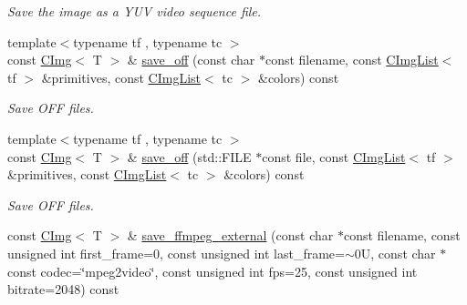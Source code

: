 \begin{DoxyCompactItemize}
\begin{DoxyCompactList}\small\item\em Save the image as a YUV video sequence file. \item\end{DoxyCompactList}\item 
\hypertarget{structcimg__library_1_1CImg_aa8165baedf5bff63743f29619bd17a2f}{
{\footnotesize template$<$typename tf , typename tc $>$ }\\const \hyperlink{structcimg__library_1_1CImg}{CImg}$<$ T $>$ \& \hyperlink{structcimg__library_1_1CImg_aa8165baedf5bff63743f29619bd17a2f}{save\_\-off} (const char $\ast$const filename, const \hyperlink{structcimg__library_1_1CImgList}{CImgList}$<$ tf $>$ \&primitives, const \hyperlink{structcimg__library_1_1CImgList}{CImgList}$<$ tc $>$ \&colors) const }
\label{structcimg__library_1_1CImg_aa8165baedf5bff63743f29619bd17a2f}

\begin{DoxyCompactList}\small\item\em Save OFF files. \item\end{DoxyCompactList}\item 
\hypertarget{structcimg__library_1_1CImg_a2b879f8faaf4b852516d990327dc75f1}{
{\footnotesize template$<$typename tf , typename tc $>$ }\\const \hyperlink{structcimg__library_1_1CImg}{CImg}$<$ T $>$ \& \hyperlink{structcimg__library_1_1CImg_a2b879f8faaf4b852516d990327dc75f1}{save\_\-off} (std::FILE $\ast$const file, const \hyperlink{structcimg__library_1_1CImgList}{CImgList}$<$ tf $>$ \&primitives, const \hyperlink{structcimg__library_1_1CImgList}{CImgList}$<$ tc $>$ \&colors) const }
\label{structcimg__library_1_1CImg_a2b879f8faaf4b852516d990327dc75f1}

\begin{DoxyCompactList}\small\item\em Save OFF files. \item\end{DoxyCompactList}\item 
\hypertarget{structcimg__library_1_1CImg_a448254417252031390da9f0397c6fed1}{
const \hyperlink{structcimg__library_1_1CImg}{CImg}$<$ T $>$ \& \hyperlink{structcimg__library_1_1CImg_a448254417252031390da9f0397c6fed1}{save\_\-ffmpeg\_\-external} (const char $\ast$const filename, const unsigned int first\_\-frame=0, const unsigned int last\_\-frame=$\sim$0U, const char $\ast$const codec=\char`\"{}mpeg2video\char`\"{}, const unsigned int fps=25, const unsigned int bitrate=2048) const }
\label{structcimg__library_1_1CImg_a448254417252031390da9f0397c6fed1}


\end{DoxyCompactItemize}
